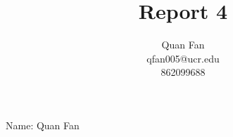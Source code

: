 \documentclass{article}
\title{Report 4}
\author{Quan Fan \\ qfan005@ucr.edu \\ 862099688}
\begin{document}
\maketitle


Name: Quan Fan
\end{document}
